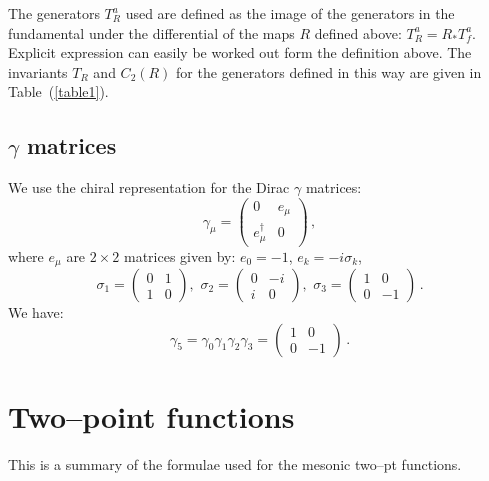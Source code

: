 \documentclass{article}[12pt]
\begin{document}
The generators $T_R^a$ used are defined as the image of the generators in the fundamental
under the differential of the maps $R$ defined above: $T^a_R = R_* T^a_f$.
Explicit expression can easily be worked out form the definition above.
The invariants $T_R$ and $C_2(R)$ for the generators defined in this way are given in
Table~(\ref{table1}).

\subsection{$\gamma$ matrices}
We use the chiral representation for the Dirac $\gamma$ matrices:
\begin{equation}
\gamma_\mu=
\begin{pmatrix}
0&e_\mu\\
e_\mu^\dagger&0
\end{pmatrix}\, ,
\end{equation}
where $e_\mu$ are $2\times 2$ matrices given by: $e_0=-1$, $e_k=-i\sigma_k$,
\begin{equation}
\sigma_1=
\begin{pmatrix}
0&1\\
1&0
\end{pmatrix},\,\,
\sigma_2=
\begin{pmatrix}
0&-i\\
i&0
\end{pmatrix},\,\,
\sigma_3=
\begin{pmatrix}
1&0\\
0&-1
\end{pmatrix}\, .
\end{equation}
We have:
\begin{equation}
\gamma_5=\gamma_0\gamma_1\gamma_2\gamma_3=
\begin{pmatrix}
1&0\\
0&-1
\end{pmatrix}\, .
\end{equation}



\section{Two--point functions}
This is a summary of the formulae used for the mesonic two--pt
functions.

\bigskip
\end{document}
